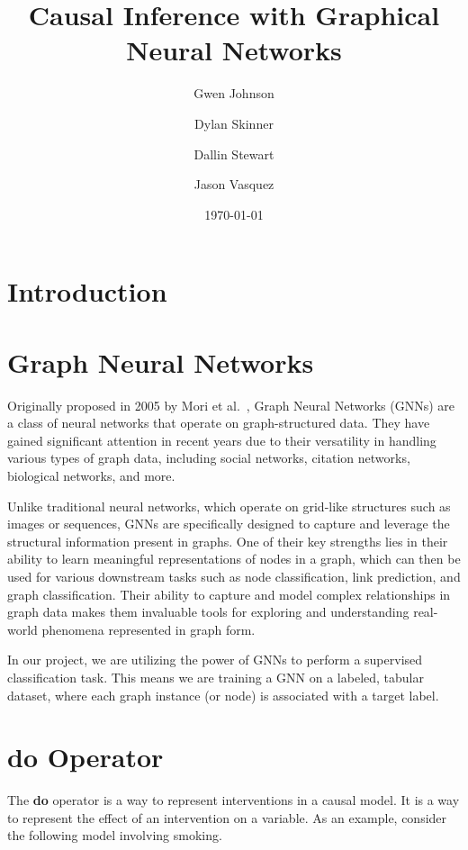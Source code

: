 \documentclass{article}
\begin{document}
\title{Causal Inference with Graphical Neural Networks}
\author{Gwen Johnson\and Dylan Skinner\and Dallin Stewart\and Jason Vasquez}
\date{\today}
\maketitle

\section{Introduction}
\label{intro}


\section{Graph Neural Networks}
\label{gnn}

Originally proposed in 2005 by Mori et al.~\cite{gori2005new}, Graph Neural Networks 
(GNNs) are a class of neural networks that operate on graph-structured data. 
They have gained significant attention in recent years due to their versatility 
in handling various types of graph data, including social networks, citation networks, 
biological networks, and more. 

Unlike traditional neural networks, which operate on 
grid-like structures such as images or sequences, GNNs are specifically designed to 
capture and leverage the structural information present in graphs. One of their 
key strengths lies in their ability to learn meaningful representations of nodes in a 
graph, which can then be used for various downstream tasks such as node classification, 
link prediction, and graph classification. Their ability to capture and model complex 
relationships in graph data makes them invaluable tools for exploring and understanding 
real-world phenomena represented in graph form.

In our project, we are utilizing the power of GNNs to perform a supervised classification
task. This means we are training a GNN on a labeled, tabular dataset, where each graph instance
(or node) is associated with a target label.



\section{$\textbf{do}$ Operator}
\label{do}

The \textbf{do} operator is a way to represent interventions in a causal model. 
It is a way to represent the effect of an intervention on a variable. As an example, 
consider the following model involving smoking.
\end{document}
